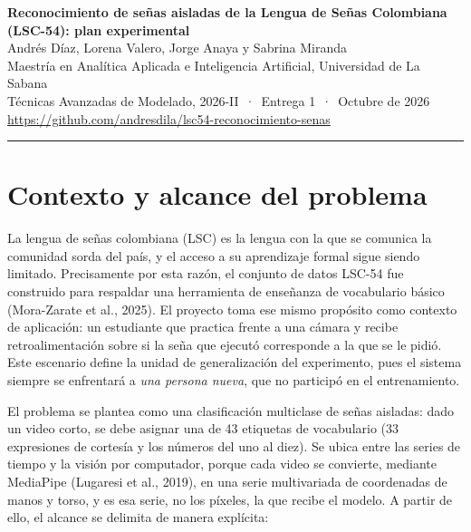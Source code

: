 \documentclass[11pt,a4paper]{article}
\begin{document}
\thispagestyle{plain}
\begin{center}
{\Large\bfseries Reconocimiento de señas aisladas de la Lengua de Señas Colombiana\\[3pt] (LSC-54): plan experimental}\\[10pt]
{\normalsize Andrés Díaz, Lorena Valero, Jorge Anaya y Sabrina Miranda}\\[3pt]
{\small Maestría en Analítica Aplicada e Inteligencia Artificial, Universidad de La Sabana}\\
{\small Técnicas Avanzadas de Modelado, 2026-II \,·\, Entrega 1 \,·\, Octubre de 2026}\\[2pt]
{\small\url{https://github.com/andresdila/lsc54-reconocimiento-senas}}
\end{center}
\vspace{4pt}
\noindent\rule{\textwidth}{0.4pt}
\vspace{2pt}

\section{Contexto y alcance del problema}

La lengua de señas colombiana (LSC) es la lengua con la que se comunica la comunidad sorda del país, y el acceso a su aprendizaje formal sigue siendo limitado. Precisamente por esta razón, el conjunto de datos LSC-54 fue construido para respaldar una herramienta de enseñanza de vocabulario básico (Mora-Zarate et al., 2025). El proyecto toma ese mismo propósito como contexto de aplicación: un estudiante que practica frente a una cámara y recibe retroalimentación sobre si la seña que ejecutó corresponde a la que se le pidió. Este escenario define la unidad de generalización del experimento, pues el sistema siempre se enfrentará a \emph{una persona nueva}, que no participó en el entrenamiento.

El problema se plantea como una clasificación multiclase de señas aisladas: dado un video corto, se debe asignar una de 43 etiquetas de vocabulario (33 expresiones de cortesía y los números del uno al diez). Se ubica entre las series de tiempo y la visión por computador, porque cada video se convierte, mediante MediaPipe (Lugaresi et al., 2019), en una serie multivariada de coordenadas de manos y torso, y es esa serie, no los píxeles, la que recibe el modelo. A partir de ello, el alcance se delimita de manera explícita:
\end{document}
